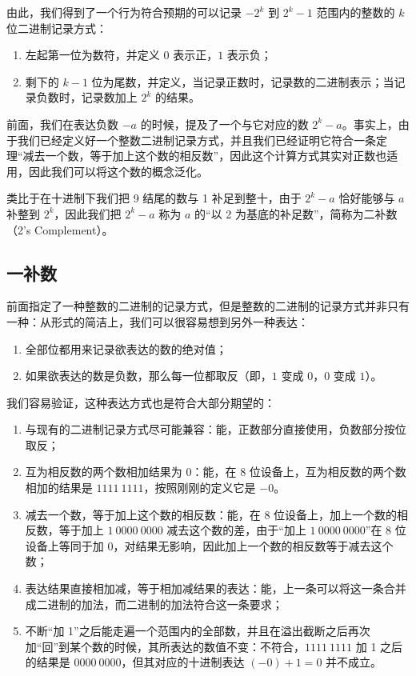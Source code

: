         由此，我们得到了一个行为符合预期的可以记录 $-2 ^ k$ 到 $2 ^ k  -1$ 范围内的整数的 $k$ 位二进制记录方式\cite{jvonneumann}：
        \begin{enumerate}
            \item 左起第一位为数符，并定义 $0$ 表示正，$1$ 表示负；
            \item 剩下的 $k - 1$ 位为尾数，并定义，当记录正数时，记录数的二进制表示；当记录负数时，记录数加上 $2 ^ k$ 的结果。
        \end{enumerate}

        前面，我们在表达负数 $-a$ 的时候，提及了一个与它对应的数 $2 ^ k - a$。事实上，由于我们已经定义好一个整数二进制记录方式，并且我们已经证明它符合一条定理“减去一个数，等于加上这个数的相反数”，因此这个计算方式其实对正数也适用，因此我们可以将这个数的概念泛化。

        类比于在十进制下我们把 9 结尾的数与 1 补足到整十，由于 $2 ^ k - a$ 恰好能够与 $a$ 补整到 $2 ^ k$，因此我们把 $2 ^ k - a$ 称为 $a$ 的“以 2 为基底的补足数”，简称为二补数（2's Complement）。

    \subsection{一补数}\label{subsec:NumberSystemBasics/BinaryPresentation/OnesComplement}
        前面指定了一种整数的二进制的记录方式，但是整数的二进制的记录方式并非只有一种：从形式的简洁上，我们可以很容易想到另外一种表达：
        \begin{enumerate}
            \item 全部位都用来记录欲表达的数的绝对值；
            \item 如果欲表达的数是负数，那么每一位都取反（即，$1$ 变成 $0$，$0$ 变成 $1$）。
        \end{enumerate}

        我们容易验证，这种表达方式也是符合大部分期望的：
        \begin{enumerate}
            \item 与现有的二进制记录方式尽可能兼容：能，正数部分直接使用，负数部分按位取反；
            \item 互为相反数的两个数相加结果为 $0$：能，在 $8$ 位设备上，互为相反数的两个数相加的结果是 $1111\ 1111$，按照刚刚的定义它是 $-0$。
            \item 减去一个数，等于加上这个数的相反数：能，在 8 位设备上，加上一个数的相反数，等于加上 $1\ 0000\ 0000$ 减去这个数的差，由于“加上 $1\ 0000\ 0000$”在 8 位设备上等同于加 $0$，对结果无影响，因此加上一个数的相反数等于减去这个数；
            \item 表达结果直接相加减，等于相加减结果的表达：能，上一条可以将这一条合并成二进制的加法，而二进制的加法符合这一条要求；
            \item 不断“加 1”之后能走遍一个范围内的全部数，并且在溢出截断之后再次加“回”到某个数的时候，其所表达的数值不变：不符合，$1111\ 1111$ 加 1 之后的结果是 $0000\ 0000$，但其对应的十进制表达 $(-0) + 1 = 0$ 并不成立。
        \end{enumerate}


